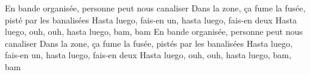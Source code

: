 \begin{guitar}
En bande organisée, personne peut nous canaliser
Dans la zone, ça fume la fusée, pisté par les banalisées
Hasta luego, fais-en un, hasta luego, fais-en deux
Hasta luego, ouh, ouh, hasta luego, bam, bam
En bande organisée, personne peut nous canaliser
Dans la zone, ça fume la fusée, pistés par les banalisées
Hasta luego, fais-en un, hasta luego, fais-en deux
Hasta luego, ouh, ouh, hasta luego, bam, bam
\end{guitar}
